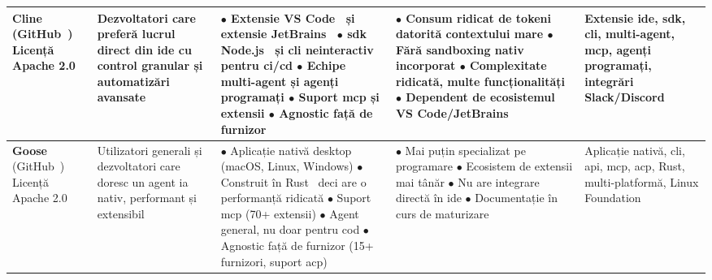 \documentclass[12pt, a4paper, oneside, romanian]{teza-upb}
\begin{document}
\begin{table}[H]
\begin{tabularx}{\textwidth}{@{} >{\hsize=0.5\hsize\RaggedRight}X >{\hsize=0.7\hsize\RaggedRight}X >{\hsize=1.1\hsize\RaggedRight}X >{\hsize=1.1\hsize\RaggedRight}X >{\hsize=0.6\hsize\RaggedRight}X @{}}
      \textbf{Cline} \newline (GitHub~\cite{gh_cline}) \newline Licență Apache 2.0 &
      Dezvoltatori care preferă lucrul direct din \ac{ide} cu control granular și automatizări avansate &
      $\bullet$ Extensie VS Code~\cite{web_vscode} și extensie JetBrains~\cite{web_jetbrains}\newline
      $\bullet$ \ac{sdk} Node.js~\cite{web_nodejs} și \ac{cli} neinteractiv pentru \ac{ci}/\ac{cd}\newline
      $\bullet$ Echipe multi-agent și agenți programați\newline
      $\bullet$ Suport \ac{mcp} și extensii\newline
      $\bullet$ Agnostic față de furnizor &
      $\bullet$ Consum ridicat de tokeni datorită contextului mare\newline
      $\bullet$ Fără sandboxing nativ incorporat\newline
      $\bullet$ Complexitate ridicată, multe funcționalități\newline
      $\bullet$ Dependent de ecosistemul VS Code/JetBrains &
      Extensie \ac{ide}, \ac{sdk}, \ac{cli}, multi-agent, \ac{mcp}, agenți programați, integrări Slack/Discord \\
      \midrule

      \textbf{Goose} \newline (GitHub~\cite{gh_goose}) \newline Licență Apache 2.0 &
      Utilizatori generali și dezvoltatori care doresc un agent \ac{ia} nativ, performant și extensibil &

      $\bullet$ Aplicație nativă desktop (macOS, Linux, Windows)\newline
      $\bullet$ Construit în Rust~\cite{web_rust} deci are o performanță ridicată\newline
      $\bullet$ Suport \ac{mcp} (70+ extensii)\newline
      $\bullet$ Agent general, nu doar pentru cod\newline
      $\bullet$ Agnostic față de furnizor (15+ furnizori, suport \ac{acp}) &
      $\bullet$ Mai puțin specializat pe programare\newline
      $\bullet$ Ecosistem de extensii mai tânăr\newline
      $\bullet$ Nu are integrare directă în \ac{ide}\newline
      $\bullet$ Documentație în curs de maturizare &
      Aplicație nativă, \ac{cli}, \ac{api}, \ac{mcp}, \ac{acp}, Rust, multi-platformă, Linux Foundation \\
      \midrule


\end{tabularx}
\end{table}
\end{document}
